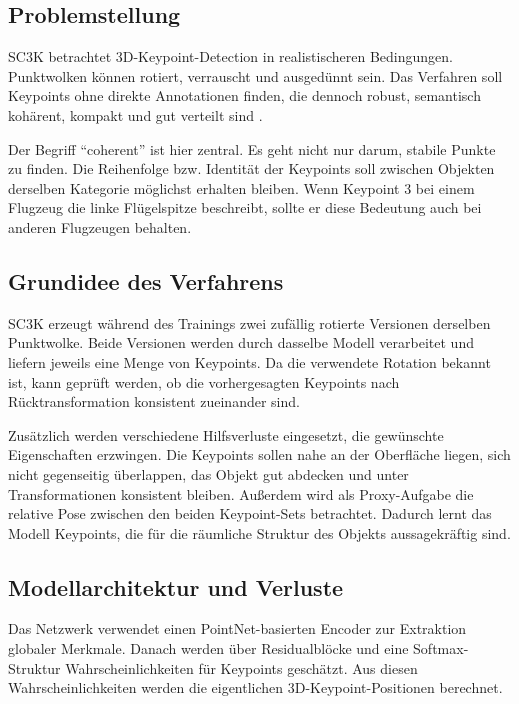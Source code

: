 \documentclass[11pt,a4paper]{article}
\begin{document}
\subsection{Problemstellung}

SC3K betrachtet 3D-Keypoint-Detection in realistischeren Bedingungen. Punktwolken können rotiert, verrauscht und ausgedünnt sein. Das Verfahren soll Keypoints ohne direkte Annotationen finden, die dennoch robust, semantisch kohärent, kompakt und gut verteilt sind \cite{zohaib2023sc3k}.

Der Begriff \enquote{coherent} ist hier zentral. Es geht nicht nur darum, stabile Punkte zu finden. Die Reihenfolge bzw. Identität der Keypoints soll zwischen Objekten derselben Kategorie möglichst erhalten bleiben. Wenn Keypoint 3 bei einem Flugzeug die linke Flügelspitze beschreibt, sollte er diese Bedeutung auch bei anderen Flugzeugen behalten.

\subsection{Grundidee des Verfahrens}

SC3K erzeugt während des Trainings zwei zufällig rotierte Versionen derselben Punktwolke. Beide Versionen werden durch dasselbe Modell verarbeitet und liefern jeweils eine Menge von Keypoints. Da die verwendete Rotation bekannt ist, kann geprüft werden, ob die vorhergesagten Keypoints nach Rücktransformation konsistent zueinander sind.

Zusätzlich werden verschiedene Hilfsverluste eingesetzt, die gewünschte Eigenschaften erzwingen. Die Keypoints sollen nahe an der Oberfläche liegen, sich nicht gegenseitig überlappen, das Objekt gut abdecken und unter Transformationen konsistent bleiben. Außerdem wird als Proxy-Aufgabe die relative Pose zwischen den beiden Keypoint-Sets betrachtet. Dadurch lernt das Modell Keypoints, die für die räumliche Struktur des Objekts aussagekräftig sind.

\subsection{Modellarchitektur und Verluste}

Das Netzwerk verwendet einen PointNet-basierten Encoder zur Extraktion globaler Merkmale. Danach werden über Residualblöcke und eine Softmax-Struktur Wahrscheinlichkeiten für Keypoints geschätzt. Aus diesen Wahrscheinlichkeiten werden die eigentlichen 3D-Keypoint-Positionen berechnet.
\end{document}
